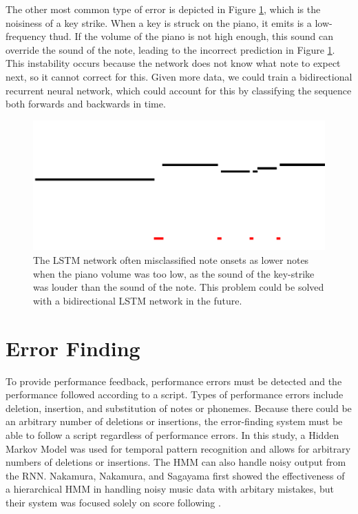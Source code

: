 \documentclass[twocolumn]{article}
\begin{document}
The other most common type of error is depicted in Figure \ref{fig:mistakes}, which is the noisiness of a key strike. When a key is struck on the piano, it emits is a low-frequency thud. If the volume of the piano is not high enough, this sound can override the sound of the note, leading to the incorrect prediction in Figure \ref{fig:mistakes}. This instability occurs because the network does not know what note to expect next, so it cannot correct for this. Given more data, we could train a bidirectional recurrent neural network, which could account for this by classifying the sequence both forwards and backwards in time.


\begin{figure}
  \includegraphics[width=\textwidth]{figures/mistakes.png}
  \caption{The LSTM network often misclassified note onsets as lower notes when the piano volume was too low, as the sound of the key-strike was louder than the sound of the note. This problem could be solved with a bidirectional LSTM network in the future.}
  \label{fig:mistakes}
\end{figure}

\section{Error Finding}

To provide performance feedback, performance errors must be detected and the performance followed according to a script. Types of performance errors include deletion, insertion, and substitution of notes or phonemes. Because there could be an arbitrary number of deletions or insertions, the error-finding system must be able to follow a script regardless of performance errors. In this study, a Hidden Markov Model  was used for temporal pattern recognition and allows for arbitrary numbers of deletions or insertions. The HMM can also handle noisy output from the RNN. Nakamura, Nakamura, and Sagayama first showed the effectiveness of a hierarchical HMM in handling noisy music data with arbitary mistakes, but their system was focused solely on score following \cite{nakamura2015real}.
\end{document}
